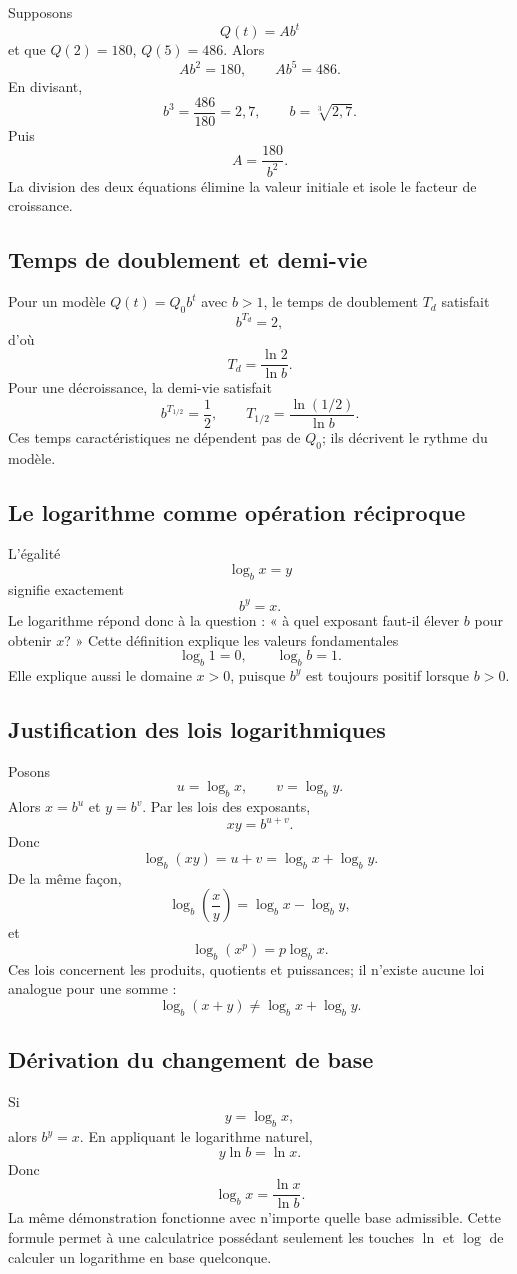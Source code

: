 \documentclass[12pt,a4paper,openany]{book}
\begin{document}
Supposons
\[
Q(t)=Ab^t
\]
et que $Q(2)=180$, $Q(5)=486$. Alors
\[
Ab^2=180,
\qquad
Ab^5=486.
\]
En divisant,
\[
b^3=\frac{486}{180}=2{,}7,
\qquad
b=\sqrt[3]{2{,}7}.
\]
Puis
\[
A=\frac{180}{b^2}.
\]
La division des deux équations élimine la valeur initiale et isole le facteur de croissance.

\subsection{Temps de doublement et demi-vie}

Pour un modèle $Q(t)=Q_0b^t$ avec $b>1$, le temps de doublement $T_d$ satisfait
\[
b^{T_d}=2,
\]
d'où
\[
T_d=\frac{\ln2}{\ln b}.
\]
Pour une décroissance, la demi-vie satisfait
\[
b^{T_{1/2}}=\frac12,
\qquad
T_{1/2}=\frac{\ln(1/2)}{\ln b}.
\]
Ces temps caractéristiques ne dépendent pas de $Q_0$; ils décrivent le rythme du modèle.

\subsection{Le logarithme comme opération réciproque}

L'égalité
\[
\log_bx=y
\]
signifie exactement
\[
b^y=x.
\]
Le logarithme répond donc à la question : « à quel exposant faut-il élever $b$ pour obtenir $x$? » Cette définition explique les valeurs fondamentales
\[
\log_b1=0,
\qquad
\log_bb=1.
\]
Elle explique aussi le domaine $x>0$, puisque $b^y$ est toujours positif lorsque $b>0$.

\subsection{Justification des lois logarithmiques}

Posons
\[
u=\log_bx,
\qquad v=\log_by.
\]
Alors $x=b^u$ et $y=b^v$. Par les lois des exposants,
\[
xy=b^{u+v}.
\]
Donc
\[
\log_b(xy)=u+v=\log_bx+\log_by.
\]
De la même façon,
\[
\log_b\left(\frac xy\right)=\log_bx-\log_by,
\]
et
\[
\log_b(x^p)=p\log_bx.
\]
Ces lois concernent les produits, quotients et puissances; il n'existe aucune loi analogue pour une somme :
\[
\log_b(x+y)\neq\log_bx+\log_by.
\]

\subsection{Dérivation du changement de base}

Si
\[
y=\log_bx,
\]
alors $b^y=x$. En appliquant le logarithme naturel,
\[
y\ln b=\ln x.
\]
Donc
\[
\log_bx=\frac{\ln x}{\ln b}.
\]
La même démonstration fonctionne avec n'importe quelle base admissible. Cette formule permet à une calculatrice possédant seulement les touches $\ln$ et $\log$ de calculer un logarithme en base quelconque.
\end{document}
